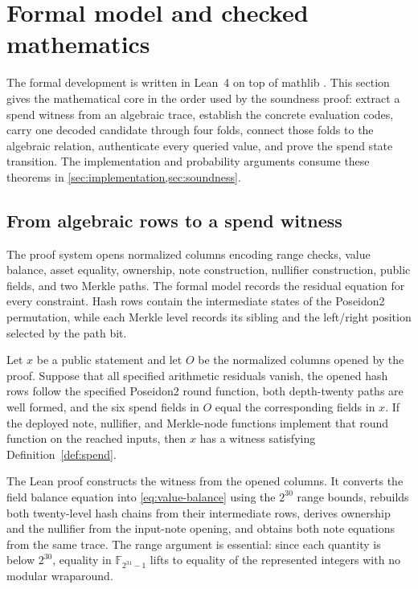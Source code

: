 \section{Formal model and checked mathematics}
\label{sec:lean-model}

The formal development is written in Lean~4 on top of mathlib
\cite{deMouraUllrich2021Lean4,MathlibCommunity2020}.  This section gives the
mathematical core in the order used by the soundness proof: extract a spend
witness from an algebraic trace, establish the concrete evaluation codes,
carry one decoded candidate through four folds, connect those folds to the
algebraic relation, authenticate every queried value, and prove the spend
state transition.  The implementation and probability arguments consume
these theorems in \cref{sec:implementation,sec:soundness}.

\subsection{From algebraic rows to a spend witness}

The proof system opens normalized columns encoding range checks, value
balance, asset equality, ownership, note construction, nullifier construction,
public fields, and two Merkle paths.  The formal model records the residual
equation for every constraint.  Hash rows contain the intermediate states of
the Poseidon2 permutation, while each Merkle level records its sibling and the
left/right position selected by the path bit.

\begin{theorem}
\label{thm:spend-after-extraction}
Let \(x\) be a public statement and let \(O\) be the normalized columns opened
by the proof.  Suppose that all specified arithmetic residuals vanish, the
opened hash rows follow the specified Poseidon2 round function, both
depth-twenty paths are well formed, and the six spend fields in \(O\) equal
the corresponding fields in \(x\).  If the deployed note, nullifier, and
Merkle-node functions implement that round function on the reached inputs,
then \(x\) has a witness satisfying Definition~\ref{def:spend}.
\end{theorem}

The Lean proof constructs the witness from the opened columns.  It converts
the field balance equation into \cref{eq:value-balance} using the
\(2^{30}\) range bounds, rebuilds both twenty-level hash chains from their
intermediate rows, derives ownership and the nullifier from the input-note
opening, and obtains both note equations from the same trace.  The range
argument is essential: since each quantity is below \(2^{30}\), equality in
\(\mathbb F_{2^{31}-1}\) lifts to equality of the represented integers with
no modular wraparound.

